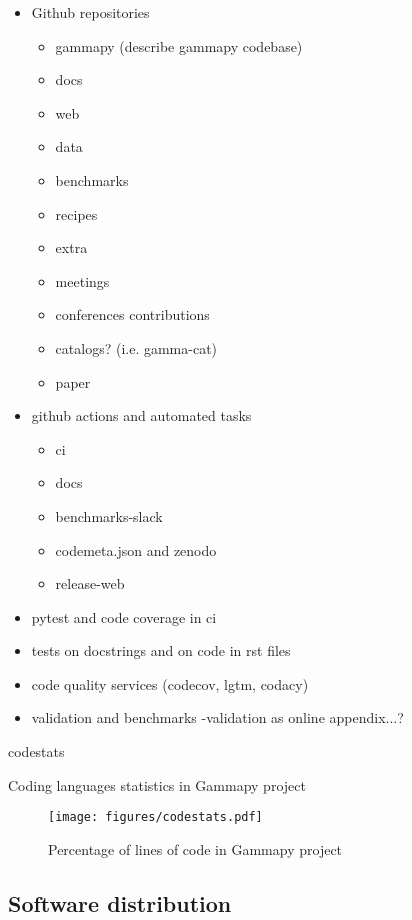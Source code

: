 \begin{itemize}
	\item Github repositories 
	\begin{itemize}
		\item gammapy (describe gammapy codebase)
		\item docs
		\item web
		\item data
		\item benchmarks
		\item recipes
		\item extra
		\item meetings
		\item conferences contributions
		\item catalogs? (i.e. gamma-cat)
		\item paper
	\end{itemize}
	\item github actions and automated tasks 
	\begin{itemize}
		\item ci
		\item docs
		\item benchmarks-slack
		\item codemeta.json and zenodo
		\item release-web
	\end{itemize}	
	\item pytest and code coverage in ci
	\item tests on docstrings and on code in rst files
	\item code quality services (codecov, lgtm, codacy)
	\item validation and benchmarks -validation as online appendix...?
\end{itemize}

\begin{table}
	{codestats}
	\caption{Coding languages statistics in Gammapy project}
	\label{table:codestats:data}
\end{table}

\begin{figure}[t]
	\centering
	\texttt{[image: figures/codestats.pdf]}
	\caption{
		Percentage of lines of code in Gammapy project} \label{fig:codestats:lang}
\end{figure}

\subsection{Software distribution}
\label{ssec:software-distribution}

